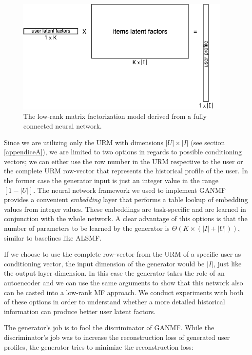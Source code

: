 \begin{figure}[h!]
    \centering
    \includegraphics[width=0.95\textwidth]{model/vector-matrix.png}
    \caption{The low-rank matrix factorization model derived from a fully connected neural network.}
    \label{fig:vector_matrix}
\end{figure}

Since we are utilizing only the URM with dimensions $|U|\times|I|$ (see section \ref{appendiceA}), we are limited to two options in regards to possible conditioning vectors; we can either use the row number in the URM respective to the user or the complete URM row-vector that represents the historical profile of the user. In the former case the generator input is just an integer value in the range $[1-|U|]$. The neural network framework we used to implement GANMF provides a convenient \emph{embedding} layer that performs a table lookup of embedding values from integer values. These embeddings are task-specific and are learned in conjunction with the whole network. A clear advantage of this options is that the number of parameters to be learned by the generator is $\Theta(K\times(|I|+|U|))$, similar to baselines like ALSMF. 

If we choose to use the complete row-vector from the URM of a specific user as conditioning vector, the input dimension of the generator would be $|I|$, just like the output layer dimension. In this case the generator takes the role of an autoencoder and we can use the same arguments to show that this network also can be casted into a low-rank MF approach. We conduct experiments with both of these options in order to understand whether a more detailed historical information can produce better user latent factors.

The generator's job is to fool the discriminator of GANMF. While the discriminator's job was to increase the reconstruction loss of generated user profiles, the generator tries to minimize the reconstruction loss:

